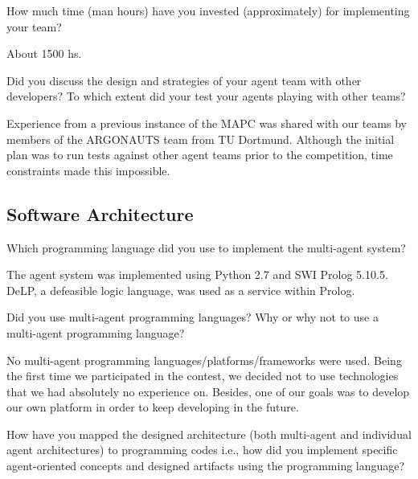 \begin{question}
How much time (man hours) have you invested (approximately) for implementing
your team?  
\end{question}


About 1500 hs.

\begin{question}
Did you discuss the design and strategies of your agent team with other
developers? To which extent did your test your agents playing with other teams?
\end{question}

Experience from a previous instance of the MAPC was shared with our teams by
members of the ARGONAUTS team from TU Dortmund\cite{Holzgen:2011}.  Although the
initial plan was to run tests against other agent teams prior to the
competition, time constraints made this impossible.

\subsection{Software Architecture}
\setcounter{question}{0}

\begin{question}
Which programming language did you use to implement the multi-agent system?  
\end{question}

The agent system was implemented using Python 2.7 and SWI Prolog 5.10.5. DeLP,
a defeasible logic language, was used as a service within Prolog.

\begin{question}
Did you use multi-agent programming languages? Why or why not to use
a multi-agent programming language?  
\end{question}

No multi-agent programming languages/platforms/frameworks were used. Being the
first time we participated in the contest, we decided not to use technologies
that we had absolutely no experience on. Besides, one of our goals was to
develop our own platform in order to keep developing in the future.

\begin{question}
How have you mapped the designed architecture (both multi-agent and individual
agent architectures) to programming codes i.e., how did you implement specific
agent-oriented concepts and designed artifacts using the programming language?  
\end{question}

